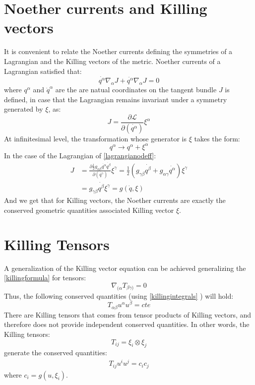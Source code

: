\section{Noether currents and Killing vectors}

It is convenient to relate the Noether currents defining the symmetries of a Lagrangian and the Killing vectors of the metric. Noether currents of a Lagrangian satisfied that:
\begin{equation}
\dot{q^\alpha} \nabla_\alpha J + \ddot{q^\alpha} \nabla_\alpha J= 0
\end{equation}
where $q^\alpha$ and $ \dot{q}^\alpha$ are the are natual coordinates on the tangent bundle $J$ is defined, in case that the Lagrangian remains invariant under a symmetry generated by $\xi$, as:
\begin{equation}
J = \frac{\partial \mathcal{L}}{\partial (\dot{q^\alpha})} \xi^\alpha
\end{equation}
At infinitesimal level, the transformation whose generator is $ \xi $ takes the form:
\begin{equation}
q^\alpha \to q^\alpha + \xi^\alpha
\end{equation}
In the case of the Lagrangian  of \cref{lagrangianodeff}:
\begin{align}
J &= \frac{\partial \frac{1}{2} g_{\alpha \beta} \dot{q^{\alpha}} \dot{q^{\beta}} }{\partial (\dot{q^\gamma})} \xi^\gamma =\frac{1}{2} (g_{\gamma \beta} \dot{q^{\beta}} + g_{\alpha \gamma} \dot{q^{\alpha}}) \xi^\gamma \\ &= g_{\gamma \beta} \dot{q^{\beta}} \xi^\gamma =g(\dot{q},\xi)
\end{align}
And we get that for Killing vectors, the Noether currents are exactly the conserved geometric quantities associated Killing vector $\xi$.

\section{Killing Tensors}
A generalization of the Killing vector equation can be achieved generalizing the \cref{killingformula} for tensors:
\begin{equation}
\nabla_{(\alpha} T_{\beta \gamma )} = 0
\end{equation}
Thus, the following conserved quantities (using \cref{killingintegrals} ) will hold:
\begin{equation}
T_{\alpha \beta} u^\alpha u^\beta = cte
\end{equation}
There are Killing tensors that comes from tensor products of Killing vectors, and therefore does not provide independent conserved quantities. In other words, the Killing tensors:
\begin{equation}
T_{i j} = \xi_i \otimes \xi_j
\end{equation}
generate the conserved quantities:
\begin{align}
T_{i j} u^i u^j = c_i c_j
\end{align}
where $c_i=g(u,\xi_i)$.
